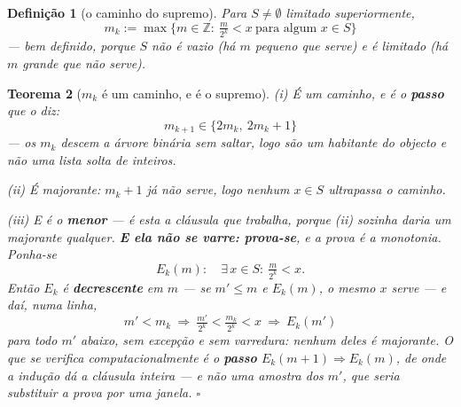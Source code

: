 \documentclass[11pt,a4paper]{article}
\newtheorem{teorema}{Teorema}
\newtheorem{definicao}[teorema]{Definição}
\begin{document}
\begin{definicao}[o caminho do supremo]\label{def:supremo}
Para $S\neq\emptyset$ limitado superiormente,
\[
m_k:=\max\bigl\{m\in\mathbb{Z}:\ \tfrac{m}{2^{k}}<x\ \text{para algum }x\in S\bigr\}
\]
--- bem definido, porque $S$ não é vazio (há $m$ pequeno que serve) e é limitado
(há $m$ grande que não serve).
\end{definicao}

\begin{teorema}[$m_k$ é um caminho, e é o supremo]\label{thm:supremo}
\emph{(i) É um caminho}, e é o \textbf{passo} que o diz:
\[
\boxed{\;m_{k+1}\in\{2m_k,\ 2m_k+1\}\;}
\]
--- os $m_k$ descem a árvore binária \emph{sem saltar}, logo são um habitante do
objecto e não uma lista solta de inteiros.

\emph{(ii) É majorante:} $m_k+1$ já não serve, logo nenhum $x\in S$ ultrapassa o
caminho.

\emph{(iii) E é o \textbf{menor}} --- é esta a cláusula que trabalha, porque (ii)
sozinha daria um majorante qualquer. \textbf{E ela não se varre: prova-se}, e a prova é
a \emph{monotonia}. Ponha-se
\[
E_k(m):\quad \exists\,x\in S:\ \tfrac{m}{2^{k}}<x .
\]
Então $E_k$ é \textbf{decrescente} em $m$ --- se $m'\leq m$ e $E_k(m)$, o mesmo $x$
serve --- e daí, numa linha,
\[
\boxed{\;m'<m_k\ \Longrightarrow\ \tfrac{m'}{2^{k}}<\tfrac{m_k}{2^{k}}<x
\ \Longrightarrow\ E_k(m')\;}
\]
para \emph{todo} $m'$ abaixo, sem excepção e sem varredura: nenhum deles é majorante.
\emph{O que se verifica computacionalmente é o \textbf{passo}} $E_k(m+1)\Rightarrow
E_k(m)$, de onde a indução dá a cláusula inteira --- e não uma amostra dos $m'$, que
seria substituir a prova por uma janela. $\square$
\end{teorema}
\end{document}

